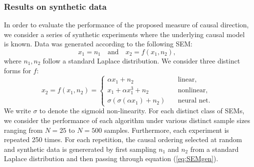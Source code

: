 \documentclass{article}
\begin{document}
\subsubsection*{Results on synthetic data}%
In order to evaluate the performance of the proposed measure of causal direction, we consider
a series of synthetic experiments where the underlying 
causal model is known. 
Data was generated according to the following 
SEM:
\begin{equation}
x_1 = n_1 ~~~ \mbox{ and } ~~~ x_2 = f( x_1, n_2),\label{eq:SEMgen}
\end{equation}
where $n_1, n_2$ follow a standard Laplace distribution. 
We consider three distinct forms for $f$:
\begin{equation*}
x_2 = f(x_1, n_2) = \begin{cases}
\alpha x_1 + n_2       & \quad \text{linear, } \\
x_1 + \alpha x_1^3 + n_2  & \quad \text{nonlinear, }\\
\sigma \left (  \sigma \left ( \alpha x_1 \right ) + n_2 \right ) &\quad \text{neural net.}
\end{cases}
\end{equation*}
We write $\sigma$ to denote the sigmoid non-linearity. 
For each distinct class of SEMs, we consider the performance of each algorithm under 
various distinct sample sizes ranging from $N=25$ to $N=500$ samples. 
Furthermore, each experiment is repeated 250 times. For each repetition, 
the causal ordering selected at random and 
synthetic data is genererated by 
 first sampling $n_1$ and $n_2$
from a standard Laplace distribution and then passing through equation (\ref{eq:SEMgen}). 

\end{document}
